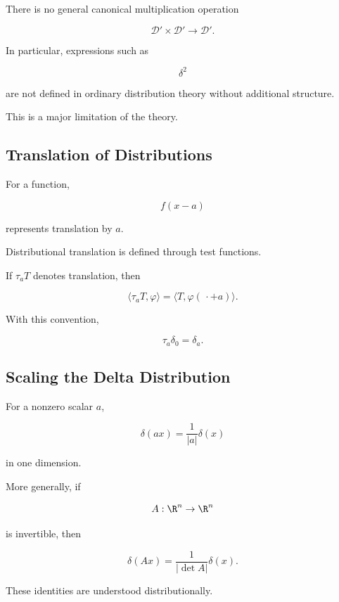 There is no general canonical multiplication operation

\[
\boxed{
\mathcal{D}'\times\mathcal{D}'
\to
\mathcal{D}'.
}
\]

In particular, expressions such as

\[
\delta^2
\]

are not defined in ordinary distribution theory without additional
structure.

This is a major limitation of the theory.

\subsection{Translation of Distributions}
\label{subsec:translation-distributions}

For a function,

\[
f(x-a)
\]

represents translation by \(a\).

Distributional translation is defined through test functions.

If \(\tau_aT\) denotes translation, then

\[
\boxed{
\langle\tau_aT,\varphi\rangle
=
\langle T,\varphi(\,\cdot+a)\rangle.
}
\]

With this convention,

\[
\boxed{
\tau_a\delta_0
=
\delta_a.
}
\]

\subsection{Scaling the Delta Distribution}
\label{subsec:delta-scaling}

For a nonzero scalar \(a\),

\[
\boxed{
\delta(ax)
=
\frac{1}{|a|}
\delta(x)
}
\]

in one dimension.

More generally, if

\[
A:\R^n\to\R^n
\]

is invertible, then

\[
\boxed{
\delta(Ax)
=
\frac{1}{|\det A|}
\delta(x).
}
\]

These identities are understood distributionally.

